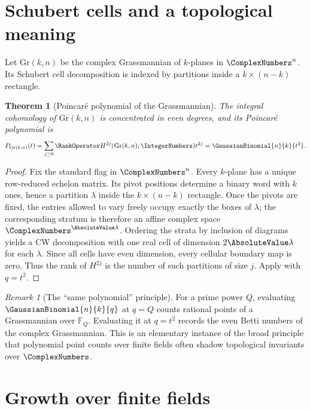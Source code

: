 \documentclass[11pt,a4paper,oneside,openany]{book}
\newtheorem{theorem}{Theorem}[chapter]
\theoremstyle{definition}
\theoremstyle{remark}
\newtheorem{remark}[remark]{Remark}
\newcommand{\F}{\mathbb F}
\begin{document}
\section{Schubert cells and a topological meaning}

Let $\mathrm{Gr}(k,n)$ be the complex Grassmannian of $k$-planes in $\ComplexNumbers^n$.  Its Schubert cell decomposition is indexed by partitions inside a $k\times(n-k)$ rectangle.

\begin{theorem}[Poincar\'e polynomial of the Grassmannian]\label{thm:grassmann-poincare}
The integral cohomology of $\mathrm{Gr}(k,n)$ is concentrated in even degrees, and its Poincar\'e polynomial is
\[
 P_{\mathrm{Gr}(k,n)}(t)
 =\sum_{j\ge0}\RankOperator H^{2j}(\mathrm{Gr}(k,n);\IntegerNumbers)t^{2j}
 =\GaussianBinomial{n}{k}{t^2}.
\]
\end{theorem}

\begin{proof}
Fix the standard flag in $\ComplexNumbers^n$.  Every $k$-plane has a unique row-reduced echelon matrix.  Its pivot positions determine a binary word with $k$ ones, hence a partition $\lambda$ inside the $k\times(n-k)$ rectangle.  Once the pivots are fixed, the entries allowed to vary freely occupy exactly the boxes of $\lambda$; the corresponding stratum is therefore an affine complex space $\ComplexNumbers^{\AbsoluteValue\lambda}$.  Ordering the strata by inclusion of diagrams yields a CW decomposition with one real cell of dimension $2\AbsoluteValue\lambda$ for each $\lambda$.  Since all cells have even dimension, every cellular boundary map is zero.  Thus the rank of $H^{2j}$ is the number of such partitions of size $j$.  Apply  with $q=t^2$.
\end{proof}

\begin{remark}[The ``same polynomial'' principle]
For a prime power $Q$, evaluating $\GaussianBinomial{n}{k}{q}$ at $q=Q$ counts rational points of a Grassmannian over $\F_Q$.  Evaluating it at $q=t^2$ records the even Betti numbers of the complex Grassmannian.  This is an elementary instance of the broad principle that polynomial point counts over finite fields often shadow topological invariants over $\ComplexNumbers$.
\end{remark}

\section{Growth over finite fields}
\end{document}
